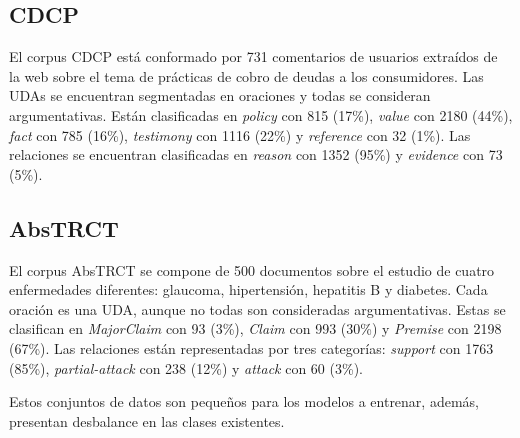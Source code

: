 \documentclass[a4paper,11pt,twocolumn,twoside]{article}
\begin{document}
\subsection{CDCP}\label{corpus:cdcp}

El corpus CDCP \cite{niculae2017argument} está conformado por 731 comentarios de usuarios extraídos de la web sobre el tema de 
prácticas de cobro de deudas a los consumidores.
Las UDAs se encuentran segmentadas en oraciones y todas se consideran argumentativas.
Están clasificadas en 
\textit{policy} con 815 (17\%), \textit{value} con 2180 (44\%), \textit{fact} con 
785 (16\%), \textit{testimony} con 1116 (22\%) y \textit{reference} con 32 (1\%). 
Las relaciones se encuentran clasificadas en \textit{reason} con 1352 (95\%) y \textit{evidence} con 73 (5\%).

\subsection{AbsTRCT}

El corpus AbsTRCT \cite{mayer2020transformer} se compone de 500 documentos sobre el estudio de cuatro enfermedades diferentes:
glaucoma, hipertensión, hepatitis B y diabetes. Cada oración es una UDA, aunque no todas son consideradas
argumentativas. Estas se clasifican en \textit{MajorClaim} con 93 (3\%), \textit{Claim} con 993 (30\%) y \textit{Premise} con 2198 (67\%).
Las relaciones están representadas por tres categorías: \textit{support} con 1763 (85\%), \textit{partial-attack} con 238 (12\%) y
\textit{attack} con 60 (3\%).

Estos conjuntos de datos son pequeños para los modelos a entrenar, además, presentan desbalance en las clases 
existentes.
\end{document}

